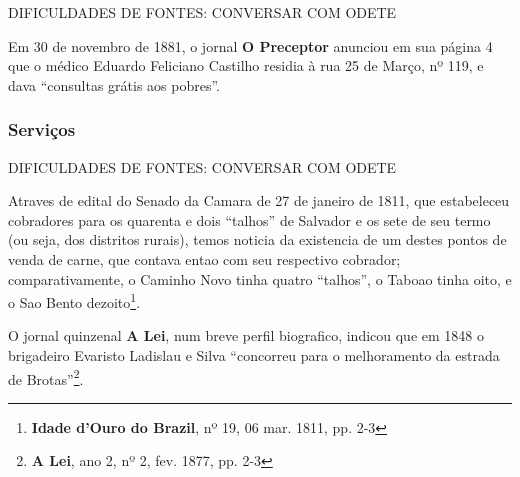 DIFICULDADES DE FONTES: CONVERSAR COM ODETE

Em 30 de novembro de 1881, o jornal \textbf{O Preceptor} anunciou em sua página 4 que o médico Eduardo Feliciano Castilho residia à rua 25 de Março, nº 119, e dava ``consultas grátis aos pobres''.

\subsubsection{Serviços}\label{subsubsec:2.5.2.2}

DIFICULDADES DE FONTES: CONVERSAR COM ODETE

Atraves de edital do Senado da Camara de 27 de janeiro de 1811, que estabeleceu cobradores para os quarenta e dois ``talhos'' de Salvador e os sete de seu termo (ou seja, dos distritos rurais), temos noticia da existencia de um destes pontos de venda de carne, que contava entao com seu respectivo cobrador; comparativamente, o Caminho Novo tinha quatro ``talhos'', o Taboao tinha oito, e o Sao Bento dezoito\footnote{\textbf{Idade d'Ouro do Brazil}, nº 19, 06 mar. 1811, pp. 2-3}.

O jornal quinzenal \textbf{A Lei}, num breve perfil biografico, indicou que em 1848 o brigadeiro Evaristo Ladislau e Silva ``concorreu para o melhoramento da estrada de Brotas''\footnote{\textbf{A Lei}, ano 2, nº 2, fev. 1877, pp. 2-3}.